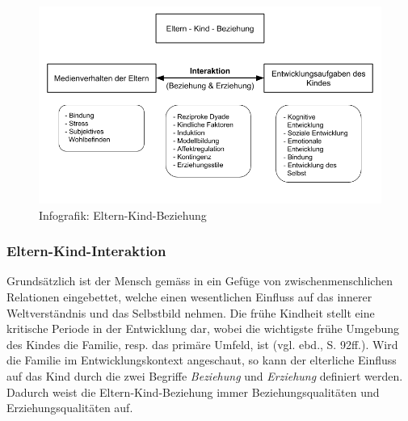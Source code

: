 \begin{figure}%
  \centering
     \includegraphics[width=1.0\textwidth]{content/Grafik/Infografik_ElternKindBeziehung_Uebersicht.png}
  \caption{Infografik: Eltern-Kind-Beziehung}
  \label{fig:InfografikElternKindBeziehung}
\end{figure}

\subsubsection{Eltern-Kind-Interaktion}\label{sec:Interaktion}
Grundsätzlich ist der Mensch gemäss  in ein Gefüge von zwischenmenschlichen Relationen eingebettet, welche einen wesentlichen Einfluss auf das innerer Weltverständnis und das Selbstbild nehmen.  Die frühe Kindheit stellt eine kritische Periode in der Entwicklung dar, wobei die wichtigste frühe Umgebung des Kindes die Familie, resp. das primäre Umfeld, ist (vgl. ebd., S. 92ff.). Wird die Familie im Entwicklungskontext angeschaut, so kann der elterliche Einfluss auf das Kind durch die zwei Begriffe \textit{Beziehung} und \textit{Erziehung} definiert werden. Dadurch weist die Eltern-Kind-Beziehung immer Beziehungsqualitäten und Erziehungsqualitäten auf.  

